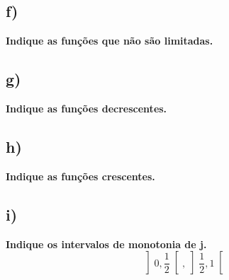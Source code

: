\documentclass[a4paper]{article}
\begin{document}
\subsection*{f)}
\textbf{Indique as funções que não são limitadas.}
\subsection*{g)}
\textbf{Indique as funções decrescentes.}
\subsection*{h)}
\textbf{Indique as funções crescentes.}
\subsection*{i)}
\textbf{Indique os intervalos de monotonia de j.}
\[\left]0,\frac{1}{2}\right[,\left]\frac{1}{2},1\right[\]
\end{document}
